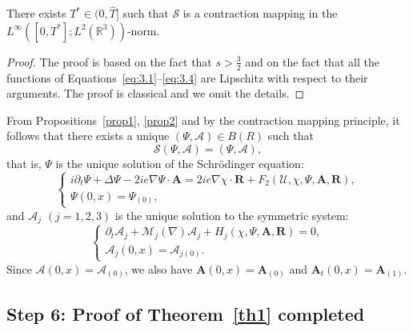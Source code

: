 \documentclass[10pt]{amsart}
\theoremstyle{definition}\newtheorem{defi}[theo]{Definition}\newtheorem{rema}[theo]{Remark}\newtheorem{exam}[theo]{Example}\newtheorem{exem}[theo]{Example}\newtheorem{nota}[theo]{Notation}
\newcommand{\BA}{\mathbf{A}}
\newcommand{\BR}{\mathbf{R}}
\newcommand{\R}{\mathbb{R}}
\begin{document}
\begin{prop}\label{prop2}
There exists $T^* \in (0,\hat{T}]$ such that $\mathcal{S}$ is a contraction mapping in the $L^\infty ([0,T^*];L^2(\R^3))$-norm.
\end{prop}

\begin{proof}
The proof is based on the fact that $s>\frac{3}{2}$ and on the fact that all the functions of Equations~\eqref{eq:3.1}--\eqref{eq:3.4} are Lipschitz with respect to their arguments. The proof is classical and we omit the details.
\end{proof}

From Propositions~\ref{prop1}, \ref{prop2} and by the contraction mapping principle, it follows that there exists a unique $(\Psi, \mathcal{A}) \in B(R)$ such that
\[
\mathcal{S}(\Psi,\mathcal{A})=(\Psi,\mathcal{A}),
\]
that is, $\Psi$ is the unique solution of the Schr\"odinger equation:
\[
\begin{cases}
i\partial_t {\Psi}+\Delta {\Psi}- 2i e \nabla {\Psi} \cdot \BA = 2ie \nabla\chi \cdot \BR +F_2(\mathcal{U},\chi,\Psi,\BA, \BR), \\
\Psi(0,x)=\Psi_{(0)},
\end{cases}
\]
and $\mathcal{A}_j$ $(j=1,2,3)$ is the unique solution to the symmetric system:
\[
\begin{cases}
\partial_t \mathcal{A}_j+\mathcal{M}_j(\nabla)\mathcal{A}_j +H_j(\chi, \Psi, \BA, \BR)=0, \\
\mathcal{A}_j(0,x)=\mathcal{A}_{j(0)}.
\end{cases}
\]
Since $\mathcal{A}(0,x)=\mathcal{A}_{(0)}$, we also have $\BA(0,x)=\BA_{(0)}$ and $\BA_t(0,x)=\BA_{(1)}$.

\subsection*{Step 6: Proof of Theorem~\ref{th1} completed}
\end{document}
